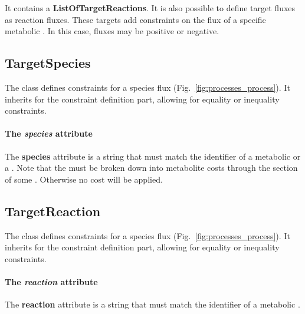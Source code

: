 It contains a \textbf{ListOfTargetReactions}.
It is also possible to define target fluxes as reaction fluxes.
These targets add constraints on the flux of a specific metabolic \reaction.
In this case, fluxes may be positive or negative.


\subsection{TargetSpecies}
\label{sec:target_species}

The \targetspecies{} class defines constraints for a species flux
(Fig.~\ref{fig:processes_process}).
It inherits \targetvalue{} for the constraint definition part, allowing for
equality or inequality constraints.

\paragraph{The \textit{species} attribute}
The \textbf{species} attribute is a string that must match the identifier
of a metabolic \species{} or a \macromolecule{}.
Note that the \macromolecule{} must be broken down into metabolite costs
through the \operations{} section of some \process{}.
Otherwise no cost will be applied.


\subsection{TargetReaction}
\label{sec:target_reaction}

The \targetreaction{} class defines constraints for a species flux
(Fig.~\ref{fig:processes_process}).
It inherits \targetvalue{} for the constraint definition part, allowing for
equality or inequality constraints.

\paragraph{The \textit{reaction} attribute}
The \textbf{reaction} attribute is a string that must match the identifier
of a metabolic \reaction{}.
